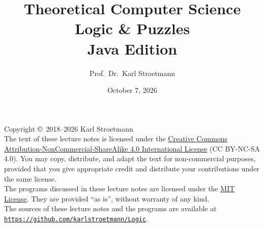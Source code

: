 \documentclass[11pt,twoside]{report}
\title{Theoretical Computer Science \\
       Logic \& Puzzles \\[0.3cm]
       {\large Java Edition}}
\author{Prof.~Dr.~Karl Stroetmann}
\date{October 7, 2026}
\begin{document}
\maketitle
\newpage
\thispagestyle{empty}
\vspace*{\fill}
\noindent
Copyright \copyright\ 2018--2026 Karl Stroetmann
\\[0.3cm]
The text of these lecture notes is licensed under the
\href{https://creativecommons.org/licenses/by-nc-sa/4.0/}{Creative Commons
Attribution-NonCommercial-ShareAlike 4.0 International License} (CC BY-NC-SA 4.0).
You may copy, distribute, and adapt the text for non-commercial purposes, provided that
you give appropriate credit and distribute your contributions under the same license.
\\[0.3cm]
The programs discussed in these lecture notes are licensed under the
\href{https://opensource.org/license/mit}{MIT License}.  They are provided ``as is'',
without warranty of any kind.
\\[0.3cm]
The sources of these lecture notes and the programs are available at
\\[0.2cm]
\hspace*{\fill}
\href{https://github.com/karlstroetmann/Logic}{\texttt{https://github.com/karlstroetmann/Logic}}.
\hspace*{\fill}
\tableofcontents


\printglossary[type=\acronymtype]

%
%
%


%






\printindex
\end{document}
